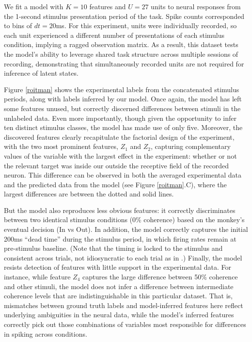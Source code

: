 \documentclass[10pt,letterpaper]{article}
\begin{document}
We fit a model with $K = 10$ features and $U = 27$ units to neural responses from the 1-second stimulus presentation period of the task. Spike counts corresponded to bins of $dt = 20$ms. For this experiment, units were individually recorded, so each unit experienced a different number of presentations of each stimulus condition, implying a ragged observation matrix. As a result, this dataset tests the model's ability to leverage shared task structure across multiple sessions of recording, demonstrating that simultaneously recorded units are not required for inference of latent states.

Figure \ref{roitman} shows the experimental labels from the concatenated stimulus periods, along with labels inferred by our model. Once again, the model has left some features unused, but correctly discerned differences between stimuli in the unlabeled data. Even more importantly, though given the opportunity to infer ten distinct stimulus classes, the model has made use of only five. Moreover, the discovered features clearly recapitulate the factorial design of the experiment, with the two most prominent features, $Z_1$ and $Z_2$, capturing complementary values of the variable with the largest effect in the experiment: whether or not the relevant target was inside our outside the receptive field of the recorded neuron. This difference can be observed in both the averaged experimental data and the predicted data from the model (see Figure \ref{roitman}.C), where the largest differences are between the dotted and solid lines.

But the model also reproduces less obvious features: it correctly discriminates between two identical stimulus conditions (0\% coherence) based on the monkey's eventual decision (In vs Out). In addition, the model correctly captures the initial 200ms ``dead time'' during the stimulus period, in which firing rates remain at pre-stimulus baseline. (Note that the timing is locked to the stimulus and consistent across trials, not idiosyncratic to each trial as in \cite{Latimer2015-pb}.) Finally, the model resists detection of features with little support in the experimental data. For instance, while feature $Z_4$ captures the large difference between 50\% coherence and other stimuli, the model does not infer a difference between intermediate coherence levels that are indistinguishable in this particular dataset. That is, mismatches between ground truth labels and model-inferred features here reflect underlying ambiguities in the neural data, while the model's inferred features correctly pick out those combinations of variables most responsible for differences in spiking across conditions.
\end{document}
